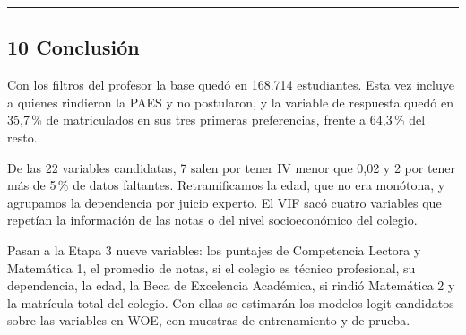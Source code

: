 \documentclass[11pt]{article}
\begin{document}
\medskip\hrule\medskip

\subsection*{10 \; Conclusión}

Con los filtros del profesor la base quedó en 168.714 estudiantes. Esta
vez incluye a quienes rindieron la PAES y no postularon, y la variable de
respuesta quedó en 35,7\,\% de matriculados en sus tres primeras
preferencias, frente a 64,3\,\% del resto.

De las 22 variables candidatas, 7 salen por tener IV menor que 0,02 y 2
por tener más de 5\,\% de datos faltantes. Retramificamos la edad, que no
era monótona, y agrupamos la dependencia por juicio experto. El VIF sacó
cuatro variables que repetían la información de las notas o del nivel
socioeconómico del colegio.

Pasan a la Etapa 3 nueve variables: los puntajes de Competencia Lectora
y Matemática 1, el promedio de notas, si el colegio es técnico
profesional, su dependencia, la edad, la Beca de Excelencia Académica, si
rindió Matemática 2 y la matrícula total del colegio. Con ellas se
estimarán los modelos logit candidatos sobre las variables en WOE, con
muestras de entrenamiento y de prueba.
\end{document}
